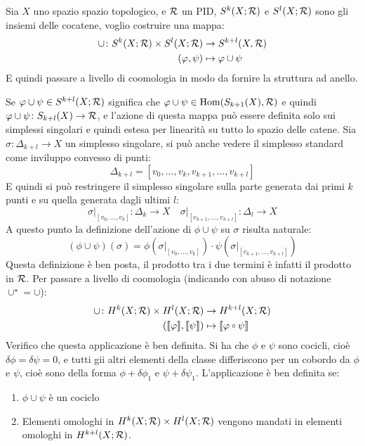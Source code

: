 Sia $ X $ uno spazio spazio topologico, e $ \mathcal{R} $ un PID,
$ S^k(X; \mathcal{R}) $ e $ S^l(X; \mathcal{R}) $ sono gli insiemi delle cocatene,
voglio costruire una mappa:
\begin{align*}
  \cup \colon S^k(X; \mathcal{R}) \times S^l(X; \mathcal{R}) & \to S^{k+l}(X, \mathcal{R}) \\
  (\varphi, \psi) & \mapsto \varphi \cup \psi
\end{align*}
E quindi passare a livello di coomologia in modo da fornire la struttura
ad anello.

Se $ \varphi \cup \psi \in S^{k+l}(X; \mathcal{R}) $ significa che $ \varphi \cup \psi \in \mathrm{Hom}( S_{k+1}(X), \mathcal{R}) $
e quindi $ \varphi \cup \psi \colon S_{k+l}(X) \to \mathcal{R} $, e l'azione di questa mappa può essere
definita solo sui simplessi singolari e quindi estesa per linearità su tutto
lo spazio delle catene. Sia $ \sigma \colon \Delta_{k+l} \to X $ un simplesso singolare, si
può anche vedere il simplesso standard come inviluppo convesso di punti:
\[
  \Delta_{k+l} = [v_0, \dots, v_k, v_{k+1}, \dots, v_{k+l}]
\]
E quindi si può restringere il simplesso singolare sulla parte generata
dai primi $ k $ punti e su quella generata dagli ultimi $ l $:
\[
  \sigma \lvert_{[v_0, \dots, v_k]} \colon \Delta_k \to X \quad \sigma \lvert_{[v_{k+1}, \dots, v_{k+l}]} \colon \Delta_l \to X
\]
A questo punto la definizione dell'azione di $ \phi \cup \psi $ su $ \sigma $ risulta naturale:
\[
  (\phi \cup \psi)(\sigma) = \phi \left(\sigma \lvert_{[v_0, \dots, v_k]} \right) \cdot \psi \left(\sigma \lvert_{[v_{k+1}, \dots, v_{k+l}]}\right)
\]
Questa definizione è ben posta, il prodotto tra i due termini è infatti il prodotto in $ \mathcal{R} $.
Per passare a livello di coomologia (indicando con abuso di notazione $ \cup^\star = \cup $):
\begin{align*}
  \cup \colon H^k(X; \R) \times H^l(X; \R) & \to H^{k+l}(X; \R) \\
  (\llbracket \phi \rrbracket, \llbracket \psi \rrbracket) & \mapsto \llbracket \phi \circ \psi \rrbracket
\end{align*}
Verifico che questa applicazione è ben definita. Si ha che $ \phi $ e $ \psi $ sono
cocicli, cioè $ \delta \phi = \delta \psi = 0 $, e tutti gii altri elementi della classe differiscono
per un cobordo da $ \phi $ e $ \psi $, cioè sono della forma $ \phi + \delta\phi_1 $ e $ \psi + \delta\psi_1 $.
L'applicazione è ben definita se:
\begin{enumerate}
\item $ \phi \cup \psi $ è un cociclo
\item Elementi omologhi in $ H^k(X; \mathcal{R}) \times H^l(X; \mathcal{R}) $ vengono
  mandati in elementi omologhi in $ H^{k+l}(X; \mathcal{R}) $.
\end{enumerate}
